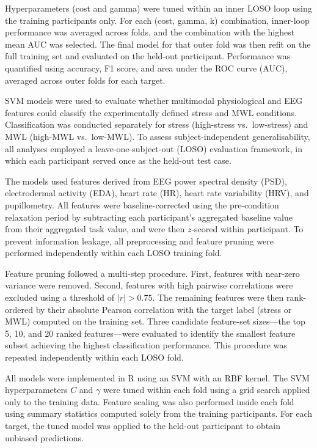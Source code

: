 \documentclass[lettersize,journal]{IEEEtran}
\begin{document}
Hyperparameters (cost and gamma) were tuned within an inner LOSO loop using the training participants only. For each (cost, gamma, k) combination, inner-loop performance was averaged across folds, and the combination with the highest mean AUC was selected. The final model for that outer fold was then refit on the full training set and evaluated on the held-out participant. Performance was quantified using accuracy, F1 score, and area under the ROC curve (AUC), averaged across outer folds for each target.

SVM models were used to evaluate whether multimodal physiological and EEG features could classify the experimentally defined stress and MWL conditions. Classification was conducted separately for stress (high-stress vs.\ low-stress) and MWL (high-MWL vs.\ low-MWL). To assess subject-independent generalisability, all analyses employed a leave-one-subject-out (LOSO) evaluation framework, in which each participant served once as the held-out test case.

The models used features derived from EEG power spectral density (PSD), electrodermal activity (EDA), heart rate (HR), heart rate variability (HRV), and pupillometry. All features were baseline-corrected using the pre-condition relaxation period by subtracting each participant's aggregated baseline value from their aggregated task value, and were then $z$-scored within participant. To prevent information leakage, all preprocessing and feature pruning were performed independently within each LOSO training fold.

Feature pruning followed a multi-step procedure. First, features with near-zero variance were removed. Second, features with high pairwise correlations were excluded using a threshold of $|r| > 0.75$. The remaining features were then rank-ordered by their absolute Pearson correlation with the target label (stress or MWL) computed on the training set. Three candidate feature-set sizes—the top 5, 10, and 20 ranked features—were evaluated to identify the smallest feature subset achieving the highest classification performance. This procedure was repeated independently within each LOSO fold.

All models were implemented in R using an SVM with an RBF kernel. The SVM hyperparameters $C$ and $\gamma$ were tuned within each fold using a grid search applied only to the training data. Feature scaling was also performed inside each fold using summary statistics computed solely from the training participants. For each target, the tuned model was applied to the held-out participant to obtain unbiased predictions.
\end{document}
